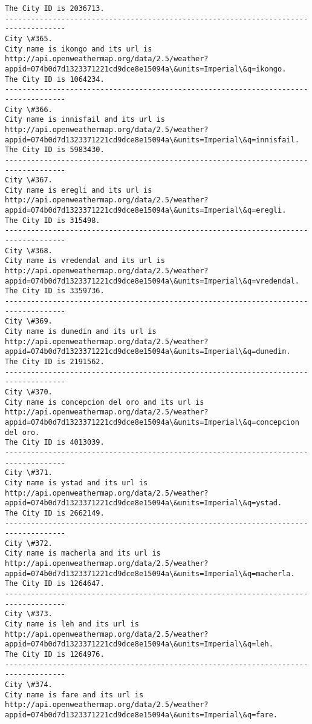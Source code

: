 \documentclass[11pt]{article}
\begin{document}
\begin{Verbatim}[commandchars=\\\{\}]
The City ID is 2036713.
------------------------------------------------------------------------------------
City \#365.
City name is ikongo and its url is http://api.openweathermap.org/data/2.5/weather?appid=074b0d7d1323371221cd9dce8e15094a\&units=Imperial\&q=ikongo.
The City ID is 1064234.
------------------------------------------------------------------------------------
City \#366.
City name is innisfail and its url is http://api.openweathermap.org/data/2.5/weather?appid=074b0d7d1323371221cd9dce8e15094a\&units=Imperial\&q=innisfail.
The City ID is 5983430.
------------------------------------------------------------------------------------
City \#367.
City name is eregli and its url is http://api.openweathermap.org/data/2.5/weather?appid=074b0d7d1323371221cd9dce8e15094a\&units=Imperial\&q=eregli.
The City ID is 315498.
------------------------------------------------------------------------------------
City \#368.
City name is vredendal and its url is http://api.openweathermap.org/data/2.5/weather?appid=074b0d7d1323371221cd9dce8e15094a\&units=Imperial\&q=vredendal.
The City ID is 3359736.
------------------------------------------------------------------------------------
City \#369.
City name is dunedin and its url is http://api.openweathermap.org/data/2.5/weather?appid=074b0d7d1323371221cd9dce8e15094a\&units=Imperial\&q=dunedin.
The City ID is 2191562.
------------------------------------------------------------------------------------
City \#370.
City name is concepcion del oro and its url is http://api.openweathermap.org/data/2.5/weather?appid=074b0d7d1323371221cd9dce8e15094a\&units=Imperial\&q=concepcion del oro.
The City ID is 4013039.
------------------------------------------------------------------------------------
City \#371.
City name is ystad and its url is http://api.openweathermap.org/data/2.5/weather?appid=074b0d7d1323371221cd9dce8e15094a\&units=Imperial\&q=ystad.
The City ID is 2662149.
------------------------------------------------------------------------------------
City \#372.
City name is macherla and its url is http://api.openweathermap.org/data/2.5/weather?appid=074b0d7d1323371221cd9dce8e15094a\&units=Imperial\&q=macherla.
The City ID is 1264647.
------------------------------------------------------------------------------------
City \#373.
City name is leh and its url is http://api.openweathermap.org/data/2.5/weather?appid=074b0d7d1323371221cd9dce8e15094a\&units=Imperial\&q=leh.
The City ID is 1264976.
------------------------------------------------------------------------------------
City \#374.
City name is fare and its url is http://api.openweathermap.org/data/2.5/weather?appid=074b0d7d1323371221cd9dce8e15094a\&units=Imperial\&q=fare.

\end{Verbatim}
\end{document}
